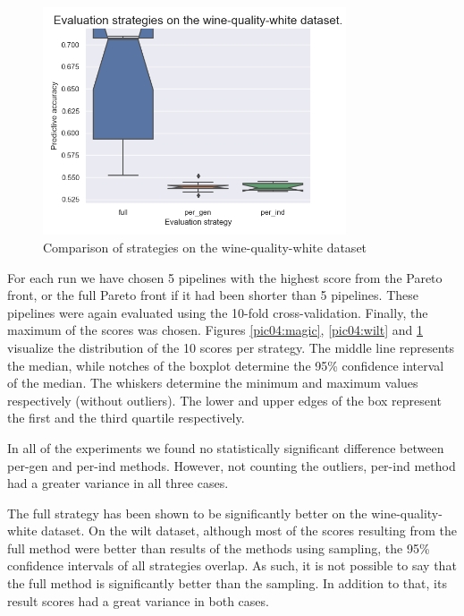 \begin{figure}[pt]\centering
\includegraphics[width=0.8\textwidth]{../img/winequality-out.png}
\caption{Comparison of strategies on the wine-quality-white dataset}
\label{pic04:winequality}
\end{figure}

For each run we have chosen 5 pipelines with the highest score
from the Pareto front, or the full Pareto front if it had been shorter than 5
pipelines. These pipelines were again evaluated using the 10-fold
cross-validation. Finally, the maximum of the scores was chosen. Figures
\ref{pic04:magic}, \ref{pic04:wilt} and \ref{pic04:winequality} visualize the
distribution of the 10 scores per strategy. The middle line represents the
median, while notches of the boxplot determine the 95\% confidence interval
of the median. The whiskers determine the minimum and maximum values
respectively (without outliers). The lower and upper edges of the box represent
the first and the third quartile respectively.

In all of the experiments we found no statistically significant difference
between per-gen and per-ind methods. However, not counting
the outliers, per-ind method had a greater variance in all three cases.

The full strategy has been shown to be significantly better on the
wine-quality-white dataset. On the wilt dataset, although most of the scores
resulting from the full method were better than results of the methods
using sampling, the 95\% confidence intervals of all strategies overlap. As
such, it is not possible to say that the full method is significantly
better than the sampling. In addition to that, its result scores had a great
variance in both cases.

